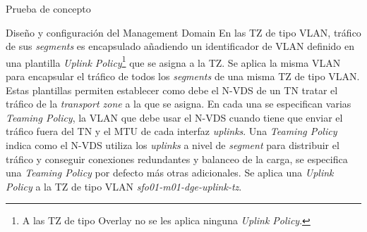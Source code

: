 \begin{section}{Prueba de concepto}
\begin{subsection}{Diseño y configuración del Management Domain}
    En las TZ de tipo VLAN, tráfico de sus \textit{segments} es encapsulado añadiendo un identificador de VLAN definido en una plantilla \textit{Uplink Policy}\footnote{A las TZ de tipo Overlay no se les aplica ninguna \textit{Uplink Policy}.} que se asigna a la TZ. Se aplica la misma VLAN para encapsular el tráfico de todos los \textit{segments} de una misma TZ de tipo VLAN. Estas plantillas permiten establecer como debe el N-VDS de un TN tratar el tráfico de la \textit{transport zone} a la que se asigna. En cada una se especifican varias \textit{Teaming Policy}, la VLAN que debe usar el N-VDS cuando tiene que enviar el tráfico fuera del TN y el MTU de cada interfaz \textit{uplinks}. Una \textit{Teaming Policy} indica como el N-VDS utiliza los \textit{uplinks} a nivel de \textit{segment} para distribuir el tráfico y conseguir conexiones redundantes y balanceo de la carga, se especifica una \textit{Teaming Policy} por defecto más otras adicionales. Se aplica una \textit{Uplink Policy} a la TZ de tipo VLAN  \textit{sfo01-m01-dge-uplink-tz}.
    \begin{figure}[h]
      \centering

\end{figure}
\end{subsection}
\end{section}
